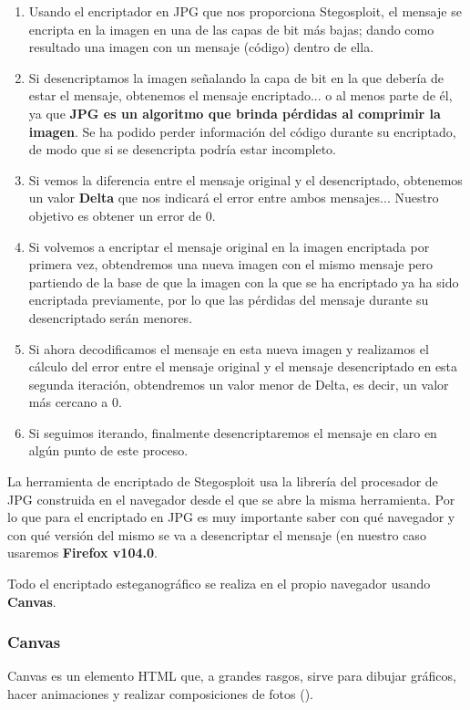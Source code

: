 \begin{enumerate}
\item Usando el encriptador en JPG que nos proporciona Stegosploit, el mensaje se encripta en la imagen en una de las capas de bit más bajas; dando como resultado una imagen con un mensaje (código) dentro de ella.
\item Si desencriptamos la imagen señalando la capa de bit en la que debería de estar el mensaje, obtenemos el mensaje encriptado... o al menos parte de él, ya que \textbf{JPG es un algoritmo que brinda pérdidas al comprimir la imagen}. Se ha podido perder información del código durante su encriptado, de modo que si se desencripta podría estar incompleto.
\item Si vemos la diferencia entre el mensaje original y el desencriptado, obtenemos un valor \textbf{Delta} que nos indicará el error entre ambos mensajes... Nuestro objetivo es obtener un error de 0.
\item Si volvemos a encriptar el mensaje original en la imagen encriptada por primera vez, obtendremos una nueva imagen con el mismo mensaje pero partiendo de la base de que la imagen con la que se ha encriptado ya ha sido encriptada previamente, por lo que las pérdidas del mensaje durante su desencriptado serán menores.
\item Si ahora decodificamos el mensaje en esta nueva imagen y realizamos el cálculo del error entre el mensaje original y el mensaje desencriptado en esta segunda iteración, obtendremos un valor menor de Delta, es decir, un valor más cercano a 0.
\item Si seguimos iterando, finalmente desencriptaremos el mensaje en claro en algún punto de este proceso.
\end{enumerate}

La herramienta de encriptado de Stegosploit usa la librería del procesador de JPG construida en el navegador desde el que se abre la misma herramienta. Por lo que para el encriptado en JPG es muy importante saber con qué navegador y con qué versión del mismo se va a desencriptar el mensaje (en nuestro caso usaremos \textbf{Firefox v104.0}.

Todo el encriptado esteganográfico se realiza en el propio navegador usando \textbf{Canvas}. %

\subsubsection{Canvas}

Canvas es un elemento HTML que, a grandes rasgos, sirve para dibujar gráficos, hacer animaciones y realizar composiciones de fotos (\cite{canvas}).

